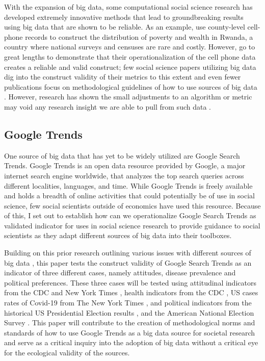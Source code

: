 With the expansion of big data, some computational social science research has
developed extremely innovative methods that lead to groundbreaking results using 
big data that are shown to be reliable. As an example,
\citet{blumenstockPredictingPovertyWealth2015} use
county-level cell-phone records to construct the distribution of poverty
and wealth in Rwanda, a country where national surveys and censuses are
rare and costly. However, \citet{blumenstockPredictingPovertyWealth2015} go to
great lengths to demonstrate that their operationalization of the cell
phone data creates a reliable and valid construct; few social science
papers utilizing big data dig into the construct validity of their
metrics to this extent and even fewer publications focus on
methodological guidelines of how to use sources of big data
\citep[For exceptions, see ][]{asseoTrackingCOVID19Using2020, stilesAssessingCriterionValidity2018}.
However, research has shown the small adjustments to an algorithm or
metric may void any research insight we are able to pull from such data
\citep{lazerParableGoogleFlu2014}.

\subsection{Google Trends}

One source of big data that has yet to be widely utilized are Google Search Trends. 
Google Trends is an open data resource provided by Google, a major internet search
engine worldwide, that analyzes the top search queries across different localities, 
languages, and time. While Google Trends is freely available and holds a breadth of 
online activities that could potentially be of use in social science, few social 
scientists outside of economics \citep[see][for examples]{choi2012predicting, jun2018ten,da2011search} have used this resource.
Because of this, I set out to establish how can we operationalize Google Search Trends as
validated indicator for uses in social science research to provide guidance to social 
scientists as they adapt different sources of big data into their toolboxes. 

Building on this prior research outlining various issues with different sources of big data
\citep{boydCriticalQuestionsBig2012,lazerIssuesConstructValidity2015},
this paper tests the construct validity of Google Search Trends as an indicator of three different
cases, namely attitudes, disease prevalence and political preferences.
These three cases will be tested using attitudinal indicators from the %
CDC \citeyearpar{vaches_data} and New York Times \citeyearpar{mask_data}, 
health indicators from the CDC \citeyearpar{suic_data}, 
US cases rates of Covid-19 from The New York Times \citeyearpar{covid_data},  
and political indicators from the historical US Presidential Election results \citeyearpar{pres_data}, 
and the American National Election Survey \citeyearpar{anes_data}. This paper will contribute to the
creation of methodological norms and standards of how to use Google
Trends as a big data source for societal research and serve as a
critical inquiry into the adoption of big data without a critical eye
for the ecological validity of the sources.

